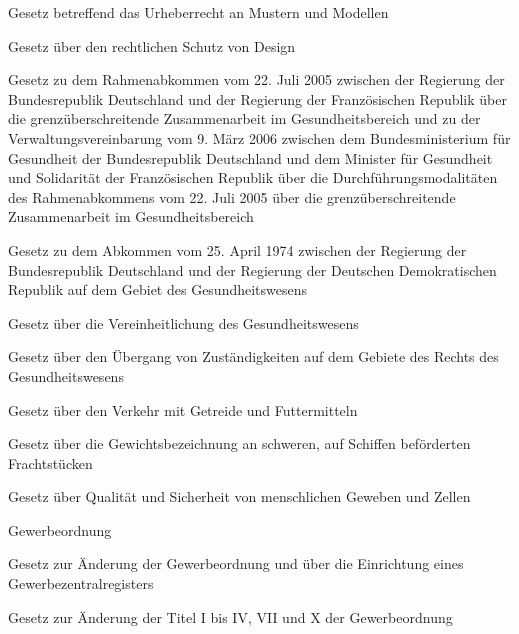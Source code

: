 \item[{GeschmMG}] Gesetz betreffend das Urheberrecht an Mustern und Modellen

\item[{GeschmMG-2004}] Gesetz über den rechtlichen Schutz von Design

\item[{GesundZAAbkFRAG}] Gesetz zu dem Rahmenabkommen vom 22. Juli 2005 zwischen der Regierung der Bundesrepublik Deutschland und der Regierung der Französischen Republik über die grenzüberschreitende Zusammenarbeit im Gesundheitsbereich und zu der Verwaltungsvereinbarung vom 9. März 2006 zwischen dem Bundesministerium für Gesundheit der Bundesrepublik Deutschland und dem Minister für Gesundheit und Solidarität der Französischen Republik über die Durchführungsmodalitäten des Rahmenabkommens vom 22. Juli 2005 über die grenzüberschreitende Zusammenarbeit im Gesundheitsbereich

\item[{GesWAbkDDRG}] Gesetz zu dem Abkommen vom 25. April 1974 zwischen der Regierung der Bundesrepublik Deutschland und der Regierung der Deutschen Demokratischen Republik auf dem Gebiet des Gesundheitswesens

\item[{GesWVereinhG}] Gesetz über die Vereinheitlichung des Gesundheitswesens

\item[{GesWZustG}] Gesetz über den Übergang von Zuständigkeiten auf dem Gebiete des Rechts des Gesundheitswesens

\item[{GetrG}] Gesetz über den Verkehr mit Getreide und Futtermitteln

\item[{GewBezG}] Gesetz über die Gewichtsbezeichnung an schweren, auf Schiffen beförderten Frachtstücken

\item[{GewebeG}] Gesetz über Qualität und Sicherheit von menschlichen Geweben und Zellen

\item[{GewO}] Gewerbeordnung

\item[{GewOÄnd-GewZRegG}] Gesetz zur Änderung der Gewerbeordnung und über die Einrichtung eines Gewerbezentralregisters

\item[{GewOÄndG-1953}] Gesetz zur Änderung der Titel I bis IV, VII und X der Gewerbeordnung

